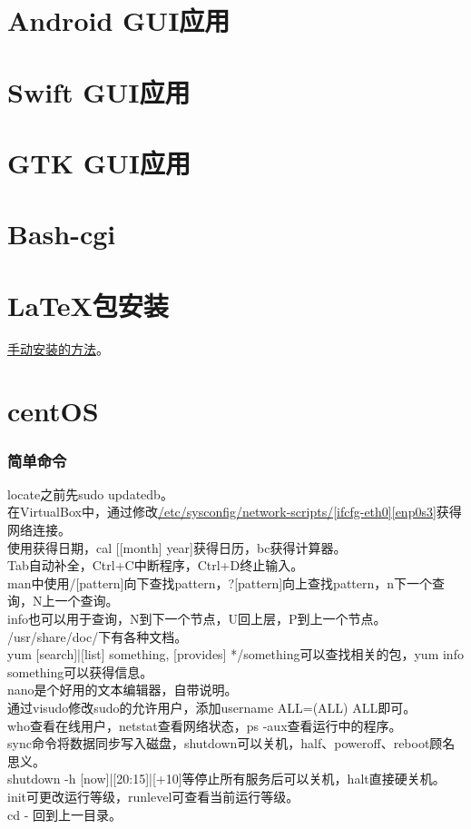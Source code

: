 \documentclass{ctexart}
\begin{document}
\section{Android GUI应用}
\section{Swift GUI应用}
\section{GTK GUI应用}
\section{Bash-cgi}

\section{LaTeX包安装}
\href{https://tex.stackexchange.com/questions/73016/how-do-i-install-an-individual-package-on-a-linux-system}{手动安装的方法}。
\section{centOS}
\subsubsection*{简单命令}
\noindent locate之前先sudo updatedb。\\
\noindent 在VirtualBox中，通过修改\href{https://unix.stackexchange.com/questions/79269/out-of-the-box-centos-in-virtualbox-nat-network-is-unreachable}{/etc/sysconfig/network-scripts/[ifcfg-eth0][enp0s3]}获得网络连接。\\
\noindent 使用获得日期，cal [[month] year]获得日历，bc获得计算器。\\
\noindent Tab自动补全，Ctrl+C中断程序，Ctrl+D终止输入。\\
\noindent man中使用/[pattern]向下查找pattern，?[pattern]向上查找pattern，n下一个查询，N上一个查询。\\
\noindent info也可以用于查询，N到下一个节点，U回上层，P到上一个节点。\\
\noindent /usr/share/doc/下有各种文档。\\
\noindent yum [search]|[list] something, [provides] */something可以查找相关的包，yum info something可以获得信息。\\
\noindent nano是个好用的文本编辑器，自带说明。\\
\noindent 通过visudo修改sudo的允许用户，添加username ALL=(ALL) ALL即可。\\
\noindent who查看在线用户，netstat查看网络状态，ps -aux查看运行中的程序。\\
\noindent sync命令将数据同步写入磁盘，shutdown可以关机，half、poweroff、reboot顾名思义。\\
\noindent shutdown -h [now]|[20:15]|[+10]等停止所有服务后可以关机，halt直接硬关机。\\
\noindent init可更改运行等级，runlevel可查看当前运行等级。\\
\noindent cd - 回到上一目录。
\end{document}
